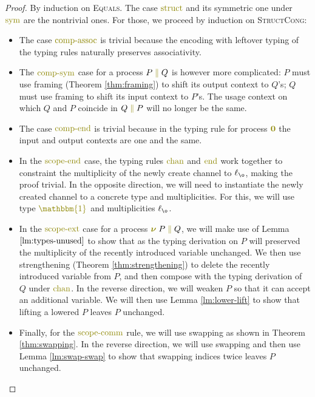 \documentclass[a4paper,UKenglish,cleveref, autoref, thm-restate,authorcolumns]{lipics-v2019}
\theoremstyle{definition}
\newcommand{\constr}[1]{\textcolor{olive}{\operatorname{#1}}}
\newcommand{\PO}{\constr{\mathbf{0}}}
\newcommand{\comp}[2]{#1 \; \constr{\parallel} \; #2}
\newcommand{\new}{\constr{\boldsymbol{\nu}} \;}
\newcommand{\unit}{\constr{\mathbbm{1}}}
\newcommand{\lz}{\ell_{\o}}
\begin{document}
\begin{proof}
  By induction on \textsc{Equals}.
  The case $\constr{struct}$ and its symmetric one under $\constr{sym}$ are the nontrivial ones.
  For those, we proceed by induction on \textsc{StructCong}:
  \begin{itemize}
    \item
      The case $\constr{comp-assoc}$ is trivial because the encoding with leftover typing of the typing rules naturally preserves associativity.
    \item
      The $\constr{comp-sym}$ case for a process $\comp{P}{Q}$ is however more complicated: $P$ must use framing (Theorem \ref{thm:framing}) to shift its output context to $Q$'s; $Q$ must use framing to shift its input context to $P$'s.
      The usage context on which $Q$ and $P$ coincide in $\comp{Q}{P}$ will no longer be the same.
    \item
      The case $\constr{comp-end}$ is trivial because in the typing rule for process $\PO$ the input and output contexts are one and the same.
    \item
      In the $\constr{scope-end}$ case, the typing rules $\constr{chan}$ and $\constr{end}$ work together to constraint the multiplicity of the newly create channel to $\lz$, making the proof trivial.
      In the opposite direction, we will need to instantiate the newly created channel to a concrete type and multiplicities.
      For this, we will use type $\unit$ and multiplicities $\lz$.
    \item
      In the $\constr{scope-ext}$ case for a process $\new \comp{P}{Q}$, we will make use of Lemma $\ref{lm:types-unused}$ to show that as the typing derivation on $P$ will preserved the multiplicity of the recently introduced variable unchanged.
      We then use strengthening (Theorem \ref{thm:strengthening}) to delete the recently introduced variable from $P$, and then compose with the typing derivation of $Q$ under $\constr{chan}$.
      In the reverse direction, we will weaken $P$ so that it can accept an additional variable.
      We will then use Lemma \ref{lm:lower-lift} to show that lifting a lowered $P$ leaves $P$ unchanged.
    \item
      Finally, for the $\constr{scope-comm}$ rule, we will use swapping as shown in Theorem \ref{thm:swapping}.
      In the reverse direction, we will use swapping and then use Lemma \ref{lm:swap-swap} to show that swapping indices twice leaves $P$ unchanged.
  \end{itemize}
\end{proof}
\end{document}
